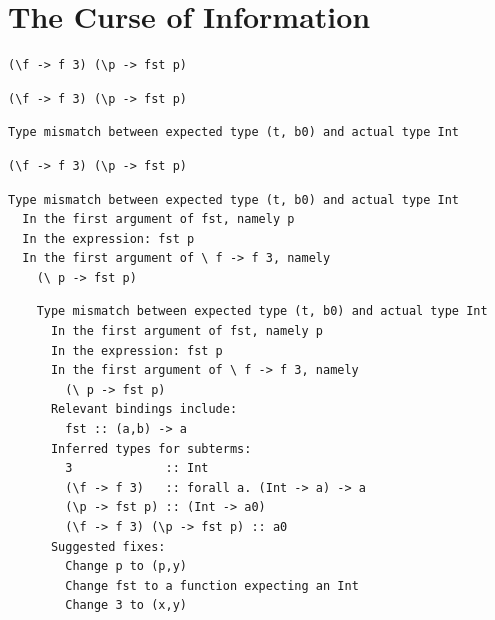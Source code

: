\documentclass[xcolor=svgnames,12pt,aspectratio=169]{beamer}
\newenvironment{xframe}[1][]
  {\begin{frame}[fragile,environment=xframe,#1]}
  {\end{frame}}
\begin{document}
\section{The Curse of Information}

\begin{xframe}{}
  \begin{center}
\begin{BVerbatim}
(\f -> f 3) (\p -> fst p)
\end{BVerbatim}
  \end{center}
\end{xframe}

\begin{xframe}{}

  \begin{center}
    \begin{BVerbatim}
(\f -> f 3) (\p -> fst p)
    \end{BVerbatim}

    \begin{verbatim}
Type mismatch between expected type (t, b0) and actual type Int
    \end{verbatim}
  \end{center}
\end{xframe}

\begin{xframe}

  \begin{center}
    \begin{BVerbatim}
(\f -> f 3) (\p -> fst p)
    \end{BVerbatim}

\begin{verbatim}
Type mismatch between expected type (t, b0) and actual type Int
  In the first argument of fst, namely p
  In the expression: fst p
  In the first argument of \ f -> f 3, namely
    (\ p -> fst p)
\end{verbatim}
  \end{center}
\end{xframe}

\begin{xframe}
  \footnotesize
  \begin{verbatim}
    Type mismatch between expected type (t, b0) and actual type Int
      In the first argument of fst, namely p
      In the expression: fst p
      In the first argument of \ f -> f 3, namely
        (\ p -> fst p)
      Relevant bindings include:
        fst :: (a,b) -> a
      Inferred types for subterms:
        3             :: Int
        (\f -> f 3)   :: forall a. (Int -> a) -> a
        (\p -> fst p) :: (Int -> a0)
        (\f -> f 3) (\p -> fst p) :: a0
      Suggested fixes:
        Change p to (p,y)
        Change fst to a function expecting an Int
        Change 3 to (x,y)
  \end{verbatim}
\end{xframe}
\end{document}
